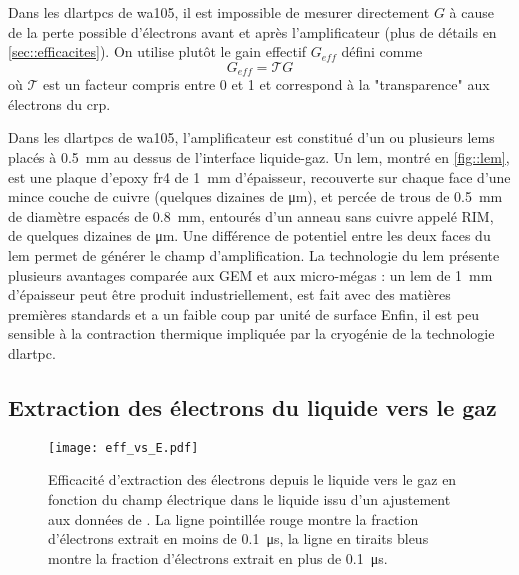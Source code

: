       Dans les \glspl{dlartpc} de \gls{wa105}, il est impossible de mesurer directement $G$ à cause de la perte possible d'électrons avant et après l'amplificateur (plus de détails en \autoref{sec::efficacites}). On utilise plutôt le gain effectif $G_{eff}$ défini comme
      \begin{equation}\label{eq::gain_eff}
        G _{eff}= \mathcal{T}G
      \end{equation}
      où $\mathcal{T}$ est un facteur compris entre 0 et 1 et correspond à la "transparence" aux électrons du \gls{crp}. 

      Dans les \glspl{dlartpc} de \gls{wa105}, l'amplificateur est constitué d'un ou plusieurs \glspl{lem} placés à \SI{0.5}{\milli\meter} au dessus de l'interface liquide-gaz. Un \gls{lem}, montré en \autoref{fig::lem}, est une plaque d'epoxy \gls{fr4} de \SI{1}{\milli\meter} d'épaisseur, recouverte sur chaque face d'une mince couche de cuivre (quelques dizaines de \si{\micro\meter}), et percée de trous de \SI{0.5}{\milli\meter} de diamètre espacés de \SI{0.8}{\milli\meter}, entourés d'un anneau sans cuivre appelé RIM, de quelques dizaines de \si{\micro\meter}. Une différence de potentiel entre les deux faces du \gls{lem} permet de générer le champ d'amplification. La technologie du \gls{lem} présente plusieurs avantages comparée aux GEM et aux micro-mégas : un \gls{lem} de \SI{1}{\milli\meter} d'épaisseur peut être produit industriellement, est fait avec des matières premières standards et a un faible coup par unité de surface Enfin, il est peu sensible à la contraction thermique impliquée par la cryogénie de la technologie \gls{dlartpc}.

    \subsection{Extraction des électrons du liquide vers le gaz}\label{sec::extraction}

      \begin{figure}[htbp]
        \centering
        \texttt{[image: eff\_vs\_E.pdf]}
        \caption[Efficacité d'extraction en fonction du champ électrique]{\label{fig::guschin}Efficacité d'extraction des électrons depuis le liquide vers le gaz en fonction du champ électrique dans le liquide issu d'un ajustement aux données de \cite{guschin}. La ligne pointillée rouge montre la fraction d'électrons extrait en moins de \SI{0.1}{\micro\second}, la ligne en tiraits bleus montre la fraction d'électrons extrait en plus de \SI{0.1}{\micro\second}.}
      \end{figure}

